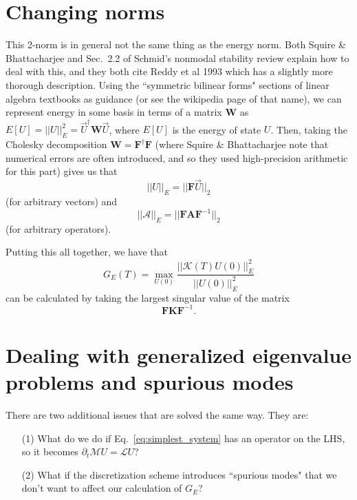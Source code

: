 \documentclass[aps,pop,preprint]{revtex4}
\begin{document}
\section{Changing norms}
\label{sec:norms}
This 2-norm is in general not the same thing as the energy norm. 
Both Squire \& Bhattacharjee and Sec.~2.2 of Schmid's nonmodal stability review explain how to deal with this, and they both cite Reddy et al 1993 which has a slightly more thorough description. 
Using the ``symmetric bilinear forms" sections of linear algebra textbooks as guidance (or see the wikipedia page of that name), we can represent energy in some basis in terms of a matrix $\mathbf{W}$ as $E[U] = ||U||_E^2 = \vec{U}^\dagger\mathbf{W}\vec{U}$, where $E[U]$ is the energy of state $U$.  
Then, taking the Cholesky decomposition $\mathbf{W} = \mathbf{F}^\dagger \mathbf{F}$ (where Squire \& Bhattacharjee note that numerical errors are often introduced, and so they used high-precision arithmetic for this part) gives us that 
\begin{equation}
||U||_E = ||\mathbf{F}\vec{U}||_2
\label{eq:E_norm_vector}
\end{equation}
(for arbitrary vectors) and
\begin{equation}
||\mathcal{A}||_E = ||\mathbf{F} \mathbf{A} \mathbf{F}^{-1} ||_2
\label{eq:E_norm_matrix}
\end{equation}
(for arbitrary operators).

Putting this all together, we have that
\begin{equation}
G_E(T) = \max_{U(0)} \frac{||\mathcal{K}(T) U(0) ||_E^2}{||U(0)||_E^2}
\label{eq:energy_gain_def}
\end{equation}
can be calculated by taking the largest singular value of the matrix
\begin{equation}
\mathbf{F} \mathbf{K} \mathbf{F}^{-1}.
\label{eq:propagator_Enorm}
\end{equation}

\section{Dealing with generalized eigenvalue problems and spurious modes}
\label{sec:eigen-subspace}
There are two additional issues that are solved the same way. 
They are:
\begin{itemize}
\item[(1)] What do we do if Eq.~\eqref{eq:simplest_system} has an operator on the LHS, so it becomes $\partial_t \mathcal{M} U = \mathcal{L} U$?
\item[(2)] What if the discretization scheme introduces ``spurious modes" that we don't want to affect our calculation of $G_E$?
\end{itemize}
\end{document}
